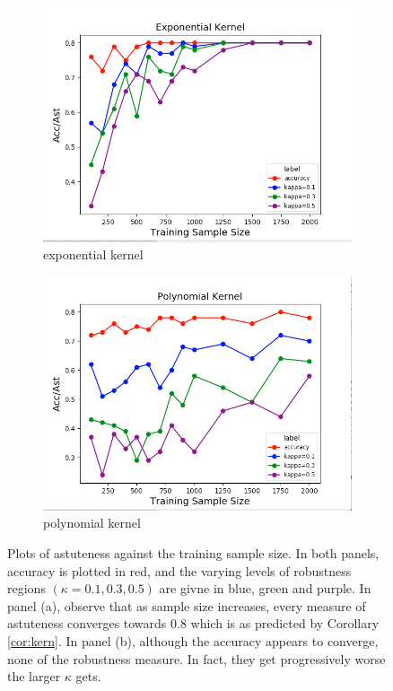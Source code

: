\begin{figure}
\begin{subfigure}{0.45\textwidth}
\includegraphics[width=\linewidth]{exponential.png}
\caption{exponential kernel} 
\end{subfigure}\hspace*{\fill}
\begin{subfigure}{0.45\textwidth}
\includegraphics[width=\linewidth]{polynomial.png}
\caption{polynomial kernel} 
\end{subfigure}

\caption{Plots of astuteness against the training sample size. In both panels, accuracy is plotted in red, and the varying levels of robustness regions $(\kappa = 0.1, 0.3, 0.5)$ are givne in blue, green and purple. In panel (a), observe that as sample size increases, every measure of astuteness converges towards $0.8$ which is as predicted by Corollary \ref{cor:kern}. In panel (b), although the accuracy appears to converge, none of the robustness measure. In fact, they get progressively worse the larger $\kappa$ gets.}
	\label{fig:validation}
\end{figure}


